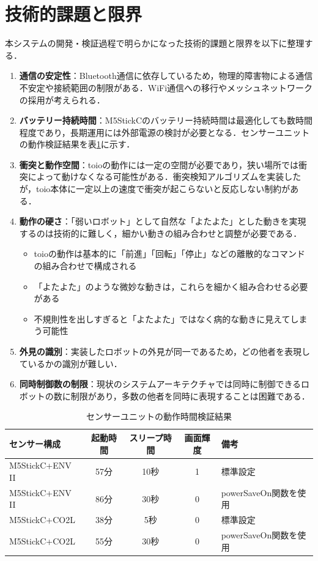 \documentclass{cuxarticle}
\begin{document}
\section{技術的課題と限界}
本システムの開発・検証過程で明らかになった技術的課題と限界を以下に整理する．

\begin{enumerate}
  \item \textbf{通信の安定性}：Bluetooth通信に依存しているため，物理的障害物による通信不安定や接続範囲の制限がある．WiFi通信への移行やメッシュネットワークの採用が考えられる．

  \item \textbf{バッテリー持続時間}：M5StickCのバッテリー持続時間は最適化しても数時間程度であり，長期運用には外部電源の検討が必要となる．センサーユニットの動作検証結果を表\ref{table:battery}に示す．

  \item \textbf{衝突と動作空間}：toioの動作には一定の空間が必要であり，狭い場所では衝突によって動けなくなる可能性がある．衝突検知アルゴリズムを実装したが，toio本体に一定以上の速度で衝突が起こらないと反応しない制約がある．

  \item \textbf{動作の硬さ}：「弱いロボット」として自然な「よたよた」とした動きを実現するのは技術的に難しく，細かい動きの組み合わせと調整が必要である．
    \begin{itemize}
      \item toioの動作は基本的に「前進」「回転」「停止」などの離散的なコマンドの組み合わせで構成される
      \item 「よたよた」のような微妙な動きは，これらを細かく組み合わせる必要がある
      \item 不規則性を出しすぎると「よたよた」ではなく病的な動きに見えてしまう可能性
    \end{itemize}

  \item \textbf{外見の識別}：実装したロボットの外見が同一であるため，どの他者を表現しているかの識別が難しい．

  \item \textbf{同時制御数の制限}：現状のシステムアーキテクチャでは同時に制御できるロボットの数に制限があり，多数の他者を同時に表現することは困難である．
\end{enumerate}

\begin{table}[htbp]
  \caption{センサーユニットの動作時間検証結果}
  \label{table:battery}
  \centering
  \begin{tabular}{|l|c|c|c|l|}
    \hline
    センサー構成 & 起動時間 & スリープ時間 & 画面輝度 & 備考 \\
    \hline
    M5StickC+ENV II & 57分 & 10秒 & 1 & 標準設定 \\
    \hline
    M5StickC+ENV II & 86分 & 30秒 & 0 & powerSaveOn関数を使用 \\
    \hline
    M5StickC+CO2L & 38分 & 5秒 & 0 & 標準設定 \\
    \hline
    M5StickC+CO2L & 55分 & 30秒 & 0 & powerSaveOn関数を使用 \\
    \hline
  \end{tabular}
\end{table}
\end{document}
